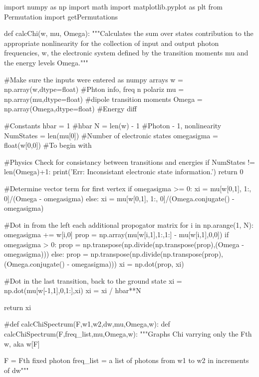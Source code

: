 \documentclass[11pt,a4paper,notitlepage]{article}
\begin{document}
\begin{code}
import numpy as np
import math
import matplotlib.pyplot as plt
from Permutation import getPermutations


def calcChi(w, mu, Omega):
    """Calculates the sum over states contribution to the appropriate 
    nonlinearity for the collection of input and output photon frequencies, w,
    the electronic system defined by the transition moments mu and the energy
    levels Omega."""

    
    #Make sure the inputs were entered as numpy arrays
    w = np.array(w,dtype=float)         #Phton info, freq n polariz
    mu = np.array(mu,dtype=float)       #dipole transition moments
    Omega = np.array(Omega,dtype=float) #Energy diff
    
    
    #Constants
    hbar = 1               #hbar
    N  = len(w) - 1        #Photon - 1, nonlinearity
    NumStates = len(mu[0]) #Number of electronic states
    omegasigma = float(w[0,0])    #To begin with
    
    
    
    #Physics Check for consistancy between transitions and energies
    if NumStates != len(Omega)+1:
        print('Err: Inconsistant electronic state information.')
        return 0



    #Determine vector term for first vertex
    if omegasigma >= 0:
        xi = mu[w[0,1], 1:, 0]/(Omega - omegasigma)
    else:
        xi = mu[w[0,1], 1:, 0]/(Omega.conjugate() - omegasigma)
    
    #Dot in from the left each additional propogator matrix
    for i in np.arange(1, N):
        omegasigma += w[i,0]
        prop = np.array(mu[w[i,1],1:,1:] - mu[w[i,1],0,0])
        if omegasigma > 0:
            prop = np.transpose(np.divide(np.transpose(prop),(Omega - omegasigma)))
        else:
            prop = np.transpose(np.divide(np.transpose(prop),(Omega.conjugate() - omegasigma)))
        xi = np.dot(prop, xi)

    #Dot in the last transition, back to the ground state
    xi = np.dot(mu[w[-1,1],0,1:],xi)
    xi = xi / hbar**N
    
    return xi

#def calcChiSpectrum(F,w1,w2,dw,mu,Omega,w):
def calcChiSpectrum(F,freq_list,mu,Omega,w):
    """Graphs Chi varrying only the Fth w, aka w[F]
        
        F  = Fth fixed photon
        freq_list = a list of photons from w1 to w2 in increments of dw"""
    

\end{code}
\end{document}
